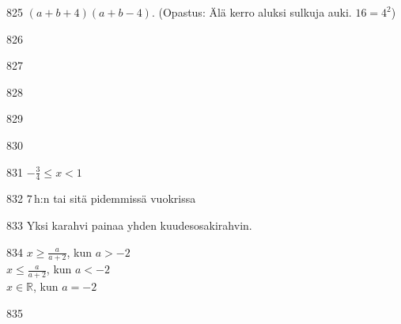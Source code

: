 \begin{Vastaus}{825}
		$(a+b+4)(a+b-4)$. (Opastus: Älä kerro aluksi sulkuja auki. $16=4^2$)
    
\end{Vastaus}
\begin{Vastaus}{826}
    
\end{Vastaus}
\begin{Vastaus}{827}
    
\end{Vastaus}
\begin{Vastaus}{828}
    
\end{Vastaus}
\begin{Vastaus}{829}
    
\end{Vastaus}
\begin{Vastaus}{830}
    
\end{Vastaus}
\begin{Vastaus}{831}
        $-\frac{3}{4} \leq x < 1$
    
\end{Vastaus}
\begin{Vastaus}{832}
	$7$\,h:n tai sitä pidemmissä vuokrissa
    
\end{Vastaus}
\begin{Vastaus}{833}
			Yksi karahvi painaa yhden kuudesosakirahvin.
	
\end{Vastaus}
\begin{Vastaus}{834}
        $x \geq \frac{a}{a+2}$, kun $a > -2$ \\
        $x \leq \frac{a}{a+2}$, kun $a < -2$ \\
    $x \in \mathbb{R}$, kun $a = -2$ \\
	
\end{Vastaus}
\begin{Vastaus}{835}
    
\end{Vastaus}
